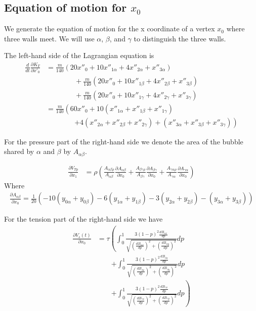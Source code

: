 \documentclass{article}
\begin{document}
\subsection{Equation of motion for $x_0$}
We generate the equation of motion for the x coordinate of a vertex $x_0$ where
three walls meet. We will use $\alpha$, $\beta$, and $\gamma$ to distinguish the
three walls.

The left-hand side of the Lagrangian equation is 
\begin{align}
\frac{d}{d t} \frac{\partial K_T}{\partial x'_0}&=
\frac{m}{140}  \left( 20x''_0+10x''_{1\alpha}+4x''_{2\alpha}+x''_{3\alpha} \right)\\
&\qquad\qquad +\frac{m}{140}\left(
20x''_0+10x''_{1\beta}+4x''_{2\beta}+x''_{3\beta}\right)\nonumber\\ 
&\qquad\qquad +\frac{m}{140} \left(
20x''_0+10x''_{1\gamma}+4x''_{2\gamma}+x''_{3\gamma} \right)\nonumber\\
 &=\frac{m}{140} \left(
60x''_0
+10(x''_{1\alpha}+x''_{1\beta}+x''_{1\gamma})\right.\nonumber\\
&\qquad\qquad \left.+4(x''_{2\alpha}+x''_{2\beta}+x''_{2\gamma})
+(x''_{3\alpha}+x''_{3\beta}+x''_{3\gamma}) \right)\nonumber
\end{align}

For the pressure part of the right-hand side we denote the area of the bubble
shared by $\alpha$ and $\beta$ by $A_{\alpha\beta}$.

\begin{align*}
\frac{\partial V_{Tp}}{\partial x_1} &= 
\rho \left(
\frac{A_{\alpha\beta\rho}}{A_{\alpha\beta}} \frac{\partial
A_{\alpha\beta}}{\partial x_0} 
+\frac{A_{\beta\gamma\rho}}{A_{\beta\gamma}} \frac{\partial
A_{\beta\gamma}}{\partial x_0} 
+\frac{A_{\gamma\alpha\rho}}{A_{\gamma\alpha}} \frac{\partial
A_{\gamma\alpha}}{\partial x_0} 
\right)
\end{align*}
Where
\begin{align*}
\frac{\partial A_{\alpha\beta}}{\partial x_0}=\frac{1}{20}
\left(-10(y_{0\alpha}+y_{0\beta})-6(y_{1\alpha}+y_{1\beta})
-3(y_{2\alpha}+y_{2\beta})-(y_{3\alpha}+y_{3\beta})\right)
\end{align*}

For the tension part of the right-hand side we have
\begin{align*}
\frac{\partial V_s(t)}{\partial x_0}&=
\tau\left(\int_0^1\frac{3(1-p)^2  \frac{d B_{\alpha x}}{dp}}{
  \sqrt{\left(\frac{d B_{\alpha x}}{dp}\right)^2+\left(\frac{d
B_{\alpha y}}{dp}\right)^2}} dp\right.\\
&\qquad \left.+\int_0^1\frac{3(1-p)^2  \frac{d B_{\beta x}}{dp}}{
  \sqrt{\left(\frac{d B_{\beta x}}{dp}\right)^2+\left(\frac{d
B_{\beta y}}{dp}\right)^2}} dp\right.\\
&\qquad \left.+\int_0^1\frac{3(1-p)^2  \frac{d B_{\gamma x}}{dp}}{
  \sqrt{\left(\frac{d B_{\gamma x}}{dp}\right)^2+\left(\frac{d
B_{\gamma y}}{dp}\right)^2}} dp
\right)
\end{align*}
\end{document}
